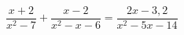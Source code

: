 \begin{ex}[type=equation]
	\begin{condition}
		$\dfrac{x + 2}{x^2 - 7} + \dfrac{x - 2}{x^2 - x - 6} = \dfrac{2x -3,2}{x^2 - 5x -14}$
	\end{condition}
\end{ex}